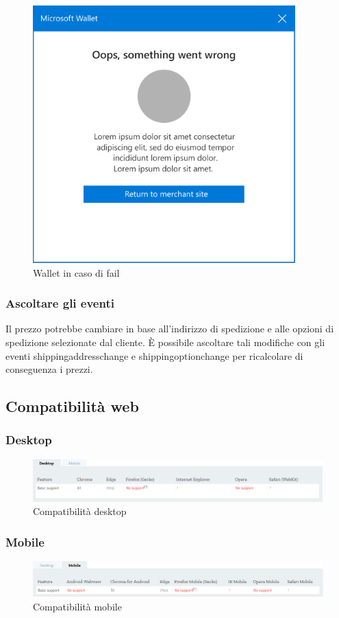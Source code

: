 \documentclass[11pt ,a4paper , twoside , openright ]{article}
\begin{document}
\begin{figure}[h]
	\centering
	\includegraphics[width=0.5\linewidth]{wallet3}
	\caption{Wallet in caso di fail}
	\label{fig: Wallet in caso di fail}
\end{figure}
\clearpage
\subsubsection{Ascoltare gli eventi}
Il prezzo potrebbe cambiare in base all'indirizzo di spedizione e alle opzioni di spedizione selezionate dal cliente. È possibile ascoltare tali modifiche con gli eventi shippingaddresschange e shippingoptionchange per ricalcolare di conseguenza i prezzi.


\subsection{Compatibilità web}
\subsubsection{Desktop}
\begin{figure}[h]
	\centering
	\includegraphics[width=1\linewidth]{Compatibilita1}
	\caption{Compatibilità desktop}
	\label{fig: Compatibilità desktop}
\end{figure}
\subsubsection{Mobile}
\begin{figure}[h]
	\centering
	\includegraphics[width=1\linewidth]{Compatibilita2}
	\caption{Compatibilità mobile}
	\label{fig: Compatibilità mobile}
\end{figure}
\end{document}
